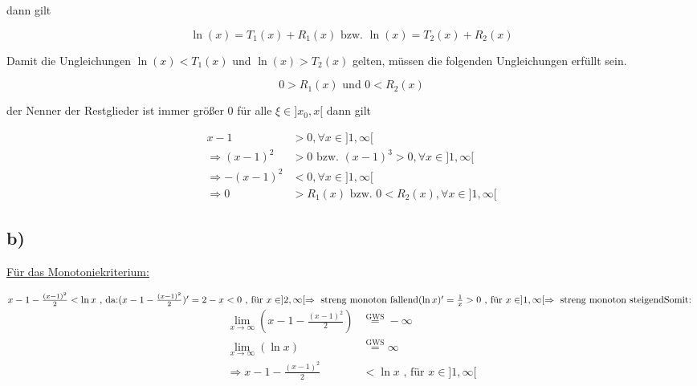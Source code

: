 \documentclass[a4paper, 11pt]{article}
\begin{document}
dann gilt

\begin{equation*}
    \ln(x) = T_1(x) + R_1(x) \text{ bzw. } \ln(x) = T_2(x) + R_2(x)
\end{equation*}

Damit die Ungleichungen \(\ln(x) < T_1(x)\) und \(\ln(x) > T_2(x)\) gelten,
müssen die folgenden Ungleichungen erfüllt sein.

\begin{equation*}
    0 > R_1(x) \text{ und } 0 < R_2(x)
\end{equation*}

der Nenner der Restglieder ist immer größer 0 für alle \(\xi \in ]x_0, x[\)
dann gilt

\begin{align*}
    x - 1 &> 0, \forall x \in ]1, \infty[ \\
    \Rightarrow (x-1)^2 &> 0 \text{ bzw. } (x-1)^3 > 0, \forall x \in ]1, \infty[ \\
    \Rightarrow -(x-1)^2 &< 0, \forall x \in ]1, \infty[ \\
    \Rightarrow 0 &> R_1(x) \text{ bzw. } 0 < R_2(x), \forall x \in ]1, \infty[
\end{align*}

\subsection{b)}
\label{sec:orgf59cf98}
\uline{Für das Monotoniekriterium:} \newline

\begin{math}
x-1-\frac{(x-1)^2}{2} < \ln x \text{ , da:}
\newline
\newline
(x-1-\frac{(x-1)^2}{2})' = 2-x < 0 \text{ , für } x \in ]2, \infty[ \Rightarrow \text{ streng monoton fallend}
\newline
\newline
(\ln x)' = \frac{1}{x} > 0 \text{ , für } x \in ]1, \infty[ \Rightarrow \text{ streng monoton steigend}
\newline
\newline
\text{Somit: }
\end{math}
\begin{align*}
	\lim \limits_{x \to \infty}\left( x-1-\frac{(x-1)^2}{2}\right) &\overset{\text{GWS}}{=} -\infty \\
	\lim \limits_{x \to \infty}(\ln x) &\overset{\text{GWS}}{=} \infty \\
	\Rightarrow x-1-\frac{(x-1)^2}{2} &< \ln x \text{ , für } x \in ]1, \infty[
\end{align*}
\end{document}
